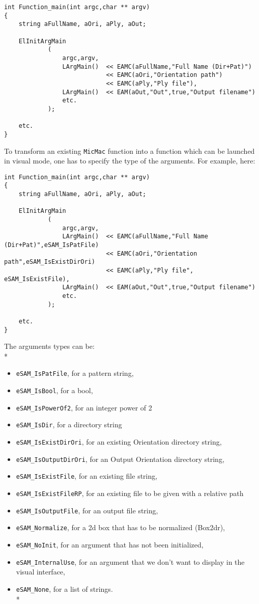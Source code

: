 \documentclass[a4paper]{book}
\begin{document}
\begin{verbatim}
int Function_main(int argc,char ** argv)
{
    string aFullName, aOri, aPly, aOut;

    ElInitArgMain
            (
                argc,argv,
                LArgMain()  << EAMC(aFullName,"Full Name (Dir+Pat)")
                            << EAMC(aOri,"Orientation path")
                            << EAMC(aPly,"Ply file"),
                LArgMain()  << EAM(aOut,"Out",true,"Output filename")
                etc.
            );
            
    etc.
}
\end{verbatim}


To transform an existing  {\tt MicMac} function into a function which can be launched in visual mode, one has to specify the type of the arguments. For example, here:

\begin{verbatim}
int Function_main(int argc,char ** argv)
{
    string aFullName, aOri, aPly, aOut;

    ElInitArgMain
            (
                argc,argv,
                LArgMain()  << EAMC(aFullName,"Full Name (Dir+Pat)",eSAM_IsPatFile)
                            << EAMC(aOri,"Orientation path",eSAM_IsExistDirOri)
                            << EAMC(aPly,"Ply file", eSAM_IsExistFile),
                LArgMain()  << EAM(aOut,"Out",true,"Output filename")
                etc.
            );
            
    etc.
}
\end{verbatim}


The arguments types can be:\\*
\begin{itemize}
\item  {\tt eSAM\_IsPatFile}, for a pattern string,
\item  {\tt eSAM\_IsBool}, for a bool,
\item  {\tt eSAM\_IsPowerOf2}, for an integer power of 2
\item  {\tt eSAM\_IsDir}, for a directory string
\item  {\tt eSAM\_IsExistDirOri}, for an existing Orientation directory string,
\item  {\tt eSAM\_IsOutputDirOri}, for an Output Orientation directory string,
\item  {\tt eSAM\_IsExistFile}, for an existing file string,
\item  {\tt eSAM\_IsExistFileRP}, for an existing file to be given with a relative path
\item  {\tt eSAM\_IsOutputFile}, for an output file string,
\item  {\tt eSAM\_Normalize}, for a 2d box that has to be normalized (Box2dr),
\item  {\tt eSAM\_NoInit}, for an argument that has not been initialized,
\item  {\tt eSAM\_InternalUse}, for an argument that we don't want to display in the visual interface,
\item {\tt eSAM\_None}, for a list of strings.\\*
\end{itemize}
\end{document}
